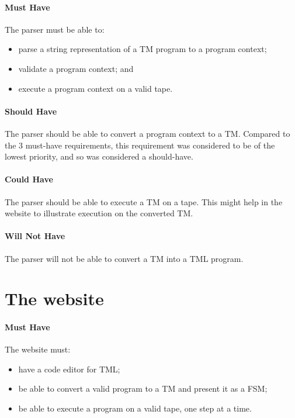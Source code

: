 \paragraph{Must Have} The parser must be able to:
\begin{itemize}
    \item parse a string representation of a TM program to a program context;
    \item validate a program context; and 
    \item execute a program context on a valid tape.
\end{itemize}

\paragraph{Should Have} The parser should be able to convert a program context to a TM. Compared to the 3 must-have requirements, this requirement was considered to be of the lowest priority, and so was considered a should-have.

\paragraph{Could Have} The parser should be able to execute a TM on a tape. This might help in the website to illustrate execution on the converted TM.

\paragraph{Will Not Have} The parser will not be able to convert a TM into a TML program.

\section{The website}

\paragraph{Must Have} The website must:
\begin{itemize}
    \item have a code editor for TML;
    \item be able to convert a valid program to a TM and present it as a FSM;
    \item be able to execute a program on a valid tape, one step at a time.
\end{itemize}

